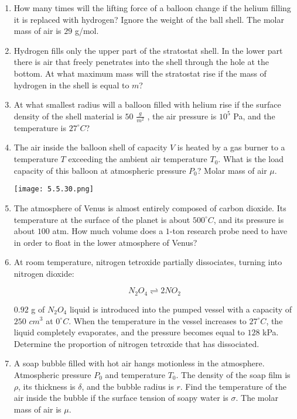 \documentclass{article}
\begin{document}
\begin{enumerate}[label=5.5.\arabic*]
\item How many times will the lifting force of a balloon change if the helium filling it is replaced with hydrogen? Ignore the weight of the ball shell. The molar mass of air is $29$ g/mol.

\item Hydrogen fills only the upper part of the stratostat shell. In the lower part there is air that freely penetrates into the shell through the hole at the bottom. At what maximum mass will the stratostat rise if the mass of hydrogen in the shell is equal to $m$?

\item At what smallest radius will a balloon filled with helium rise if the surface density of the shell material is $50$ $\frac{g}{m^2}$ , the air pressure is $10^5$ Pa, and the temperature is $27^\circ C$?

\item The air inside the balloon shell of capacity $V$ is heated by a gas burner to a temperature $T$ exceeding the ambient air temperature $T_0$. What is the load capacity of this balloon at atmospheric pressure $P_0$? Molar mass of air $\mu$.

\begin{center}
    \texttt{[image: 5.5.30.png]}
\end{center}


\item The atmosphere of Venus is almost entirely composed of carbon dioxide. Its temperature at the surface of the planet is about $500^\circ C$, and its pressure is about $100$ atm. How much volume does a $1$-ton research probe need to have in order to float in the lower atmosphere of Venus?

\item At room temperature, nitrogen tetroxide partially dissociates, turning into nitrogen dioxide: 

$$N_2O_4 \rightleftharpoons 2NO_2$$

$0.92$ g of $N_2 O_4$ liquid is introduced into the pumped vessel with a capacity of $250$ $cm^3$ at $0^\circ C$. When the temperature in the vessel increases to $27^\circ C$, the liquid completely evaporates, and the pressure becomes equal to $128$ kPa. Determine the proportion of nitrogen tetroxide that has dissociated.

\item A soap bubble filled with hot air hangs motionless in the atmosphere. Atmospheric pressure $P_0$ and temperature $T_0$. The density of the soap film is $\rho$, its thickness is $\delta$, and the bubble radius is $r$. Find the temperature of the air inside the bubble if the surface tension of soapy water is $\sigma$. The molar mass of air is $\mu$.


\end{enumerate}
\end{document}
